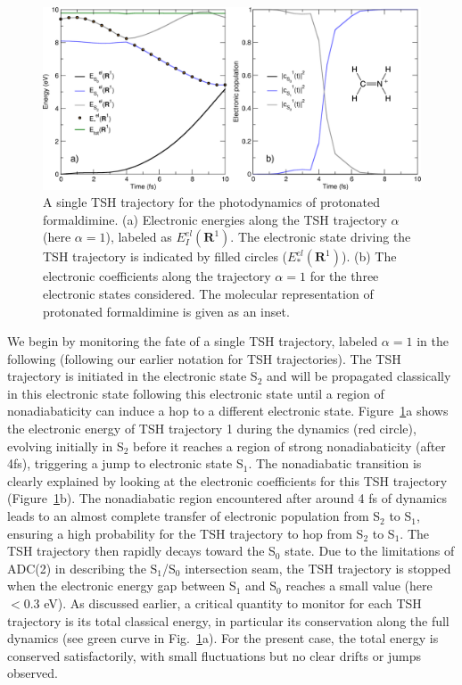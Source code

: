 \documentclass[9pt,bestpractices]{livecoms}
\newcommand{\bs}{\mathbf}
\begin{document}
\begin{figure}[h!]
    \centering
    \includegraphics[width=1.0\linewidth]{./figures/tsh_traj1.png}
    \caption{A single TSH trajectory for the photodynamics of protonated formaldimine. (a) Electronic energies along the TSH trajectory $\alpha$ (here $\alpha=1$), labeled as $E_I^{el}(\bs R^1)$. The electronic state driving the TSH trajectory is indicated by filled circles ($E_\ast^{el}(\bs R^1)$). (b) The electronic coefficients along the trajectory $\alpha=1$ for the three electronic states considered. The molecular representation of protonated formaldimine is given as an inset.}
    \label{fig:tshrun}
\end{figure}

We begin by monitoring the fate of a single TSH trajectory, labeled $\alpha=1$ in the following (following our earlier notation for TSH trajectories). The TSH trajectory is initiated in the electronic state S$_2$ and will be propagated classically in this electronic state following this electronic state until a region of nonadiabaticity can induce a hop to a different electronic state. Figure~\ref{fig:tshrun}a shows the electronic energy of TSH trajectory 1 during the dynamics (red circle), evolving initially in S$_2$ before it reaches a region of strong nonadiabaticity (after 4fs), triggering a jump to electronic state S$_1$. The nonadiabatic transition is clearly explained by looking at the electronic coefficients for this TSH trajectory (Figure~\ref{fig:tshrun}b). The nonadiabatic region encountered after around 4 fs of dynamics leads to an almost complete transfer of electronic population from S$_2$ to S$_1$, ensuring a high probability for the TSH trajectory to hop from S$_2$ to S$_1$. The TSH trajectory then rapidly decays toward the S$_0$ state. Due to the limitations of ADC(2) in describing the S$_1$/S$_0$ intersection seam, the TSH trajectory is stopped when the electronic energy gap between S$_1$ and S$_0$ reaches a small value (here $<0.3$ eV). As discussed earlier, a critical quantity to monitor for each TSH trajectory is its total classical energy, in particular its conservation along the full dynamics (see green curve in Fig.~\ref{fig:tshrun}a). For the present case, the total energy is conserved satisfactorily, with small fluctuations but no clear drifts or jumps observed. 
\end{document}
